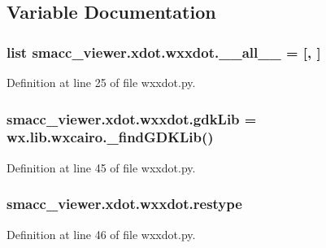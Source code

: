 \subsection{Variable Documentation}
\subsubsection[{\texorpdfstring{\+\_\+\+\_\+all\+\_\+\+\_\+}{__all__}}]{\setlength{\rightskip}{0pt plus 5cm}list smacc\+\_\+viewer.\+xdot.\+wxxdot.\+\_\+\+\_\+all\+\_\+\+\_\+ = \mbox{[}\textquotesingle{}, \textquotesingle{}\mbox{]}\hspace{0.3cm}{\ttfamily [private]}}\hypertarget{namespacesmacc__viewer_1_1xdot_1_1wxxdot_a5470eaae084906d34ddd06ca7d44838e}{}\label{namespacesmacc__viewer_1_1xdot_1_1wxxdot_a5470eaae084906d34ddd06ca7d44838e}


Definition at line 25 of file wxxdot.\+py.

\subsubsection[{\texorpdfstring{gdk\+Lib}{gdkLib}}]{\setlength{\rightskip}{0pt plus 5cm}smacc\+\_\+viewer.\+xdot.\+wxxdot.\+gdk\+Lib = wx.\+lib.\+wxcairo.\+\_\+find\+G\+D\+K\+Lib()}\hypertarget{namespacesmacc__viewer_1_1xdot_1_1wxxdot_a9e4cf3660e919da4b1430fbea1065d03}{}\label{namespacesmacc__viewer_1_1xdot_1_1wxxdot_a9e4cf3660e919da4b1430fbea1065d03}


Definition at line 45 of file wxxdot.\+py.

\subsubsection[{\texorpdfstring{restype}{restype}}]{\setlength{\rightskip}{0pt plus 5cm}smacc\+\_\+viewer.\+xdot.\+wxxdot.\+restype}\hypertarget{namespacesmacc__viewer_1_1xdot_1_1wxxdot_aad3e2be0350fd8f6d4430c598cde1838}{}\label{namespacesmacc__viewer_1_1xdot_1_1wxxdot_aad3e2be0350fd8f6d4430c598cde1838}


Definition at line 46 of file wxxdot.\+py.

